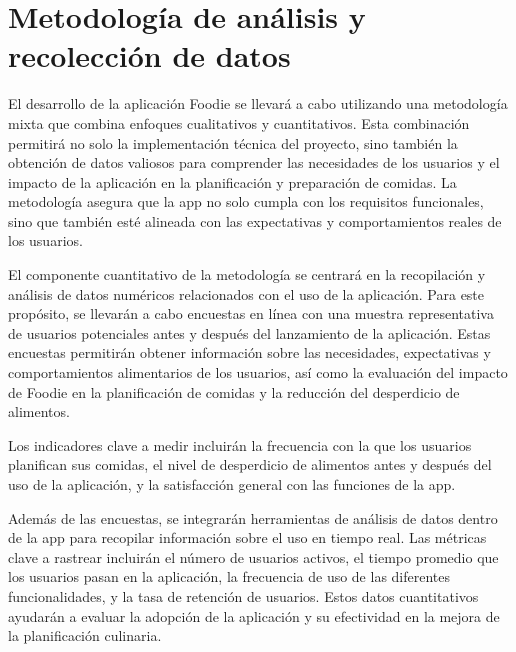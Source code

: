 \documentclass[a4paper,12pt]{article}
\begin{document}
\section*{Metodología de análisis y recolección de datos}
El desarrollo de la aplicación Foodie se llevará a cabo utilizando una metodología mixta que combina enfoques cualitativos y cuantitativos. Esta combinación permitirá no solo la implementación técnica del proyecto, sino también la obtención de datos valiosos para comprender las necesidades de los usuarios y el impacto de la aplicación en la planificación y preparación de comidas. La metodología asegura que la app no solo cumpla con los requisitos funcionales, sino que también esté alineada con las expectativas y comportamientos reales de los usuarios.

El componente cuantitativo de la metodología se centrará en la recopilación y análisis de datos numéricos relacionados con el uso de la aplicación. Para este propósito, se llevarán a cabo encuestas en línea con una muestra representativa de usuarios potenciales antes y después del lanzamiento de la aplicación. Estas encuestas permitirán obtener información sobre las necesidades, expectativas y comportamientos alimentarios de los usuarios, así como la evaluación del impacto de Foodie en la planificación de comidas y la reducción del desperdicio de alimentos.
 
Los indicadores clave a medir incluirán la frecuencia con la que los usuarios planifican sus comidas, el nivel de desperdicio de alimentos antes y después del uso de la aplicación, y la satisfacción general con las funciones de la app.

Además de las encuestas, se integrarán herramientas de análisis de datos dentro de la app para recopilar información sobre el uso en tiempo real. Las métricas clave a rastrear incluirán el número de usuarios activos, el tiempo promedio que los usuarios pasan en la aplicación, la frecuencia de uso de las diferentes funcionalidades, y la tasa de retención de usuarios. Estos datos cuantitativos ayudarán a evaluar la adopción de la aplicación y su efectividad en la mejora de la planificación culinaria.
\end{document}
